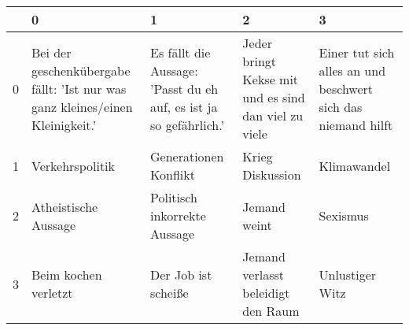 \begin{tabular}{lllll}
\toprule
 & 0 & 1 & 2 & 3 \\
\midrule
0 & Bei der geschenkübergabe fällt: 'Ist nur was ganz kleines/einen Kleinigkeit.' & Es fällt die Aussage: 'Passt du eh auf, es ist ja so gefährlich.' & Jeder bringt Kekse mit und es sind dan viel zu viele & Einer tut sich alles an und beschwert sich das niemand hilft \\
1 & Verkehrspolitik & Generationen Konflikt & Krieg Diskussion & Klimawandel \\
2 & Atheistische Aussage & Politisch inkorrekte Aussage & Jemand weint & Sexismus \\
3 & Beim kochen verletzt & Der Job ist scheiße & Jemand verlasst beleidigt den Raum & Unlustiger Witz \\
\bottomrule
\end{tabular}
